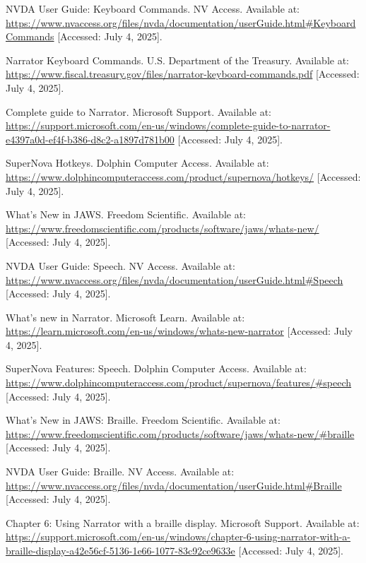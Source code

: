 \begin{thebibliography}{99}
 NVDA User Guide: Keyboard Commands. NV Access. Available at: \url{https://www.nvaccess.org/files/nvda/documentation/userGuide.html#KeyboardCommands} [Accessed: July 4, 2025].

 Narrator Keyboard Commands. U.S. Department of the Treasury. Available at: \url{https://www.fiscal.treasury.gov/files/narrator-keyboard-commands.pdf} [Accessed: July 4, 2025].

 Complete guide to Narrator. Microsoft Support. Available at: \url{https://support.microsoft.com/en-us/windows/complete-guide-to-narrator-e4397a0d-ef4f-b386-d8c2-a1897d781b00} [Accessed: July 4, 2025].

 SuperNova Hotkeys. Dolphin Computer Access. Available at: \url{https://www.dolphincomputeraccess.com/product/supernova/hotkeys/} [Accessed: July 4, 2025].

 What's New in JAWS. Freedom Scientific. Available at: \url{https://www.freedomscientific.com/products/software/jaws/whats-new/} [Accessed: July 4, 2025].

 NVDA User Guide: Speech. NV Access. Available at: \url{https://www.nvaccess.org/files/nvda/documentation/userGuide.html#Speech} [Accessed: July 4, 2025].

 What's new in Narrator. Microsoft Learn. Available at: \url{https://learn.microsoft.com/en-us/windows/whats-new-narrator} [Accessed: July 4, 2025].

 SuperNova Features: Speech. Dolphin Computer Access. Available at: \url{https://www.dolphincomputeraccess.com/product/supernova/features/#speech} [Accessed: July 4, 2025].

 What's New in JAWS: Braille. Freedom Scientific. Available at: \url{https://www.freedomscientific.com/products/software/jaws/whats-new/#braille} [Accessed: July 4, 2025].

 NVDA User Guide: Braille. NV Access. Available at: \url{https://www.nvaccess.org/files/nvda/documentation/userGuide.html#Braille} [Accessed: July 4, 2025].

 Chapter 6: Using Narrator with a braille display. Microsoft Support. Available at: \url{https://support.microsoft.com/en-us/windows/chapter-6-using-narrator-with-a-braille-display-a42e56cf-5136-1e66-1077-83c92ce9633e} [Accessed: July 4, 2025].


\end{thebibliography}
